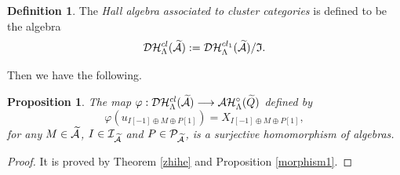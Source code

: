 \documentclass[reqno,12pt]{amsart}
\numberwithin{equation}{section}
\def\P{\mathcal{P}}\def\I{\mathcal{I}}\def\X{\mathbb X}\def\T{\mathbb T}\def\e{\mbox{\rm e}}
\theoremstyle{plain} %
\newtheorem{proposition}[theorem]{\bf Proposition}
\theoremstyle{definition} %
\newtheorem{definition}[theorem]{\bf Definition}
\begin{document}
\begin{definition}\label{Halldef}
The {\em Hall algebra associated to cluster categories} is defined to be the algebra \begin{equation*}\mathcal {D}\mathcal {H}_\Lambda^{{cl}}(\widetilde{\mathcal{A}}):=\mathcal {D}\mathcal {H}_\Lambda^{{cl}_1}(\widetilde{\mathcal{A}})/\mathfrak{I}.\end{equation*}
\end{definition}
Then we have the following.
\begin{proposition}\label{prop:surjective-hom}
The map $\varphi:\mathcal {D}\mathcal {H}_\Lambda^{{cl}}(\widetilde{\mathcal{A}})\longrightarrow\mathcal{A}\mathcal{H}_\Lambda^{\circ}(\widetilde{Q})$ defined by
$$\varphi(u_{I[-1]\oplus M\oplus P[1]})=X_{I[-1]\oplus M\oplus P[1]},$$ for any $M\in\widetilde{\mathcal{A}}$, $I\in\I_{\widetilde{\A}}$ and $P\in\P_{\widetilde{\A}}$, is a surjective homomorphism of algebras.
\end{proposition}
\begin{proof}
It is proved by Theorem \ref{zhihe} and Proposition \ref{morphism1}.
\end{proof}
\end{document}
